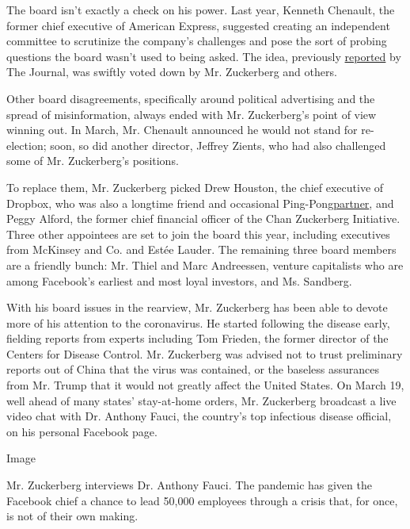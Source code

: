 The board isn't exactly a check on his power. Last year, Kenneth
Chenault, the former chief executive of American Express, suggested
creating an independent committee to scrutinize the company's challenges
and pose the sort of probing questions the board wasn't used to being
asked. The idea, previously
\href{https://www.wsj.com/articles/mark-zuckerberg-asserts-control-of-facebook-pushing-aside-dissenters-11588106984}{reported}
by The Journal, was swiftly voted down by Mr. Zuckerberg and others.

Other board disagreements, specifically around political advertising and
the spread of misinformation, always ended with Mr. Zuckerberg's point
of view winning out. In March, Mr. Chenault announced he would not stand
for re-election; soon, so did another director, Jeffrey Zients, who had
also challenged some of Mr. Zuckerberg's positions.

To replace them, Mr. Zuckerberg picked Drew Houston, the chief executive
of Dropbox, who was also a longtime friend and occasional
Ping-Pong\href{https://www.usatoday.com/story/tech/talkingtech/2017/03/09/ping-pong-night-out-tech-ceos-zuckerberg-houston-and-kalanick/98985578/}{partner},
and Peggy Alford, the former chief financial officer of the Chan
Zuckerberg Initiative. Three other appointees are set to join the board
this year, including executives from McKinsey and Co. and Estée Lauder.
The remaining three board members are a friendly bunch: Mr. Thiel and
Marc Andreessen, venture capitalists who are among Facebook's earliest
and most loyal investors, and Ms. Sandberg.

With his board issues in the rearview, Mr. Zuckerberg has been able to
devote more of his attention to the coronavirus. He started following
the disease early, fielding reports from experts including Tom Frieden,
the former director of the Centers for Disease Control. Mr. Zuckerberg
was advised not to trust preliminary reports out of China that the virus
was contained, or the baseless assurances from Mr. Trump that it would
not greatly affect the United States. On March 19, well ahead of many
states' stay-at-home orders, Mr. Zuckerberg broadcast a live video chat
with Dr. Anthony Fauci, the country's top infectious disease official,
on his personal Facebook page.

Image

Mr. Zuckerberg interviews Dr. Anthony Fauci. The pandemic has given the
Facebook chief a chance to lead 50,000 employees through a crisis that,
for once, is not of their own making.

